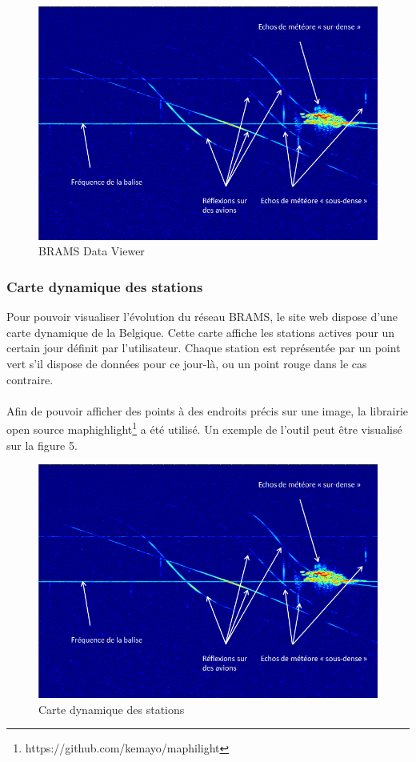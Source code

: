 \documentclass[11pt]{article}
\begin{document}
\begin{figure}[t]
    \begin{center}
        \includegraphics[scale=0.493]{spectrogramme.png}
        \caption{BRAMS Data Viewer}
    \end{center}
\end{figure}

\subsubsection{Carte dynamique des stations}
Pour pouvoir visualiser l'évolution du réseau BRAMS, le site web dispose d'une carte dynamique de la Belgique.
Cette carte affiche les stations actives pour un certain jour définit par l'utilisateur.
Chaque station est représentée par un point vert s'il dispose de données pour ce jour-là, ou un point rouge dans le cas contraire.\\
\\
Afin de pouvoir afficher des points à des endroits précis sur une image, la librairie open source maphighlight\footnote{https://github.com/kemayo/maphilight} a été utilisé.
Un exemple de l'outil peut être visualisé sur la figure 5.

\begin{figure}[t]
    \begin{center}
        \includegraphics[scale=0.493]{spectrogramme.png}
        \caption{Carte dynamique des stations}
    \end{center}
\end{figure}
\end{document}
